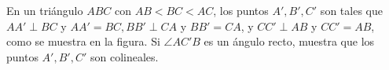En un triángulo $ABC$ con $AB < BC < AC$, los puntos $A' ,B' ,C'$ son tales que $AA' \perp BC$ y $AA' = BC, BB' \perp CA$ y $BB'=CA$, y $CC' \perp AB$ y $CC'= AB$, como se muestra en la figura. Si $\angle AC'B$ es un ángulo recto, muestra que los puntos $A',B' ,C' $ son colineales. 
